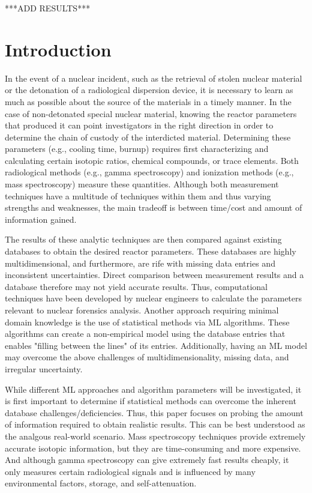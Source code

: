 \documentclass{anstrans}
\begin{document}
***ADD RESULTS***

\section{Introduction}

In the event of a nuclear incident, such as the retrieval of stolen nuclear
material or the detonation of a radiological dispersion device, it is necessary
to learn as much as possible about the source of the materials in a timely
manner. In the case of non-detonated special nuclear material, knowing the
reactor parameters that produced it can point investigators in the right
direction in order to determine the chain of custody of the interdicted
material. Determining these parameters (e.g., cooling time, burnup) requires
first characterizing and calculating certain isotopic ratios, chemical
compounds, or trace elements.  Both radiological methods (e.g., gamma
spectroscopy) and ionization methods (e.g., mass spectroscopy) measure these
quantities. Although both measurement techniques have a multitude of techniques
within them and thus varying strengths and weaknesses, the main tradeoff is
between time/cost and amount of information gained. 

The results of these analytic techniques are then compared against existing
databases to obtain the desired reactor parameters. These databases are highly
multidimensional, and furthermore, are rife with missing data entries and
inconsistent uncertainties. Direct comparison between measurement results and a
database therefore may not yield accurate results. Thus, computational
techniques have been developed by nuclear engineers to calculate the parameters
relevant to nuclear forensics analysis. Another approach requiring minimal
domain knowledge is the use of statistical methods via \gls{ML} algorithms.
These algorithms can create a non-empirical model using the database entries
that enables "filling between the lines" of its entries. Additionally, having
an \gls{ML} model may overcome the above challenges of multidimensionality,
missing data, and irregular uncertainty.

While different \gls{ML} approaches and algorithm parameters will be
investigated, it is first important to determine if statistical methods can
overcome the inherent database challenges/deficiencies. Thus, this paper
focuses on probing the amount of information required to obtain realistic
results.  This can be best understood as the analgous real-world scenario. Mass
spectroscopy techniques provide extremely accurate isotopic information, but
they are time-consuming and more expensive. And although gamma spectroscopy can
give extremely fast results cheaply, it only measures certain radiological
signals and is influenced by many environmental factors, storage, and
self-attenuation.
\end{document}
